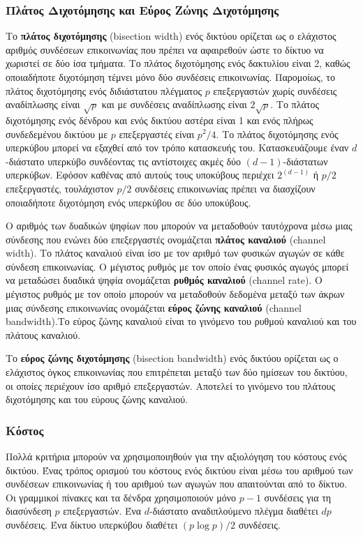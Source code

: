 \documentclass[12pt,a4paper]{article}
\begin{document}
\subsubsection*{Πλάτος Διχοτόμησης και Εύρος Ζώνης Διχοτόμησης}
Το \textbf{πλάτος διχοτόμησης} (\foreignlanguage{english}{bisection width}) 
ενός δικτύου ορίζεται ως ο ελάχιστος αριθμός συνδέσεων επικοινωνίας που 
πρέπει να αφαιρεθούν ώστε το δίκτυο να χωριστεί σε δύο ίσα τμήματα. Το 
πλάτος διχοτόμησης ενός δακτυλίου είναι 2, καθώς οποιαδήποτε διχοτόμηση
τέμνει μόνο δύο συνδέσεις επικοινωνίας. Παρομοίως, το πλάτος διχοτόμησης 
ενός διδιάστατου πλέγματος $p$ επεξεργαστών χωρίς συνδέσεις αναδίπλωσης είναι
$\sqrt{p}$ και με συνδέσεις αναδίπλωσης είναι $2\sqrt{p}$. Το πλάτος 
διχοτόμησης ενός δένδρου και ενός δικτύου αστέρα είναι 1 και ενός
πλήρως συνδεδεμένου δικτύου με $p$ επεξεργαστές είναι $p^2/4$. Το πλάτος 
διχοτόμησης ενός υπερκύβου μπορεί να εξαχθεί από τον τρόπο κατασκευής του.
Κατασκευάζουμε έναν $d$-διάστατο υπερκύβο συνδέοντας τις αντίστοιχες ακμές 
δύο $(d-1)$-διάστατων υπερκύβων. Εφόσον καθένας από αυτούς τους υποκύβους 
περιέχει $2^{(d-1)}$ ή $p/2$ επεξεργαστές, τουλάχιστον $p/2$ συνδέσεις 
επικοινωνίας πρέπει να διασχίζουν οποιαδήποτε διχοτόμηση ενός υπερκύβου 
σε δύο υποκύβους.

Ο αριθμός των δυαδικών ψηφίων που μπορούν να μεταδοθούν ταυτόχρονα μέσω 
μιας σύνδεσης που ενώνει δύο επεξεργαστές ονομάζεται \textbf{πλάτος καναλιού} 
(\foreignlanguage{english}{channel width}). Το πλάτος καναλιού είναι ίσο με
τον αριθμό των φυσικών αγωγών σε κάθε σύνδεση επικοινωνίας. Ο μέγιστος 
ρυθμός με τον οποίο ένας φυσικός αγωγός μπορεί να μεταδώσει δυαδικά
ψηφία ονομάζεται \textbf{ρυθμός καναλιού} (\foreignlanguage{english}{channel rate}).
Ο μέγιστος ρυθμός με τον οποίο μπορούν να μεταδοθούν δεδομένα μεταξύ των 
άκρων μιας σύνδεσης επικοινωνίας ονομάζεται \textbf{εύρος ζώνης καναλιού}
(\foreignlanguage{english}{channel bandwidth}).Το εύρος ζώνης καναλιού 
είναι το γινόμενο του ρυθμού καναλιού και του πλάτους καναλιού.

Το \textbf{εύρος ζώνης διχοτόμησης} (\foreignlanguage{english}{bisection bandwidth})
ενός δικτύου ορίζεται ως ο ελάχιστος όγκος επικοινωνίας που επιτρέπεται 
μεταξύ των δύο ημίσεων του δικτύου, οι οποίες περιέχουν ίσο αριθμό επεξεργαστών.
Αποτελεί το γινόμενο του πλάτους διχοτόμησης και του εύρους ζώνης καναλιού.

\subsubsection*{Κόστος}
Πολλά κριτήρια μπορούν να χρησιμοποιηθούν για την αξιολόγηση του κόστους 
ενός δικτύου. Ένας τρόπος ορισμού του κόστους ενός δικτύου είναι μέσω του 
αριθμού των συνδέσεων επικοινωνίας ή του αριθμού των αγωγών που απαιτούνται 
από το δίκτυο. Οι γραμμικοί πίνακες και τα δένδρα χρησιμοποιούν μόνο $p-1$ 
συνδέσεις για τη διασύνδεση $p$ επεξεργαστών. Ένα $d$-διάστατο αναδιπλούμενο 
πλέγμα διαθέτει $dp$ συνδέσεις. Ένα δίκτυο υπερκύβου διαθέτει $(p \log p)/2$ 
συνδέσεις.
\end{document}
